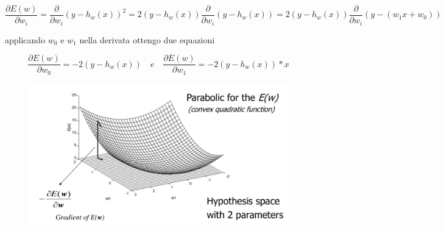 \documentclass{article}
\begin{document}
\begin{equation}
    \frac{\partial E(w)}{\partial w_i} = \frac{\partial}{\partial w_i} (y - h_w(x))^2 =  2(y - h_w(x)) \frac{\partial}{\partial w_i} (y - h_w(x)) = 2(y - h_w(x))\frac{\partial}{\partial w_i}(y - (w_1x+w_0))
\end{equation}

applicando $w_0$ e $w_1$ nella derivata ottengo due equazioni

\begin{equation}
    \frac{\partial E(w)}{\partial w_0} = -2(y - h_w(x)) \quad e \quad \frac{\partial E(w)}{\partial w_1} = -2(y - h_w(x)) * x
\end{equation}

\begin{figure}[H]
    \centering
    \includegraphics[scale=0.5]{Images/gradientlinearspace.png}
\end{figure}
\end{document}
